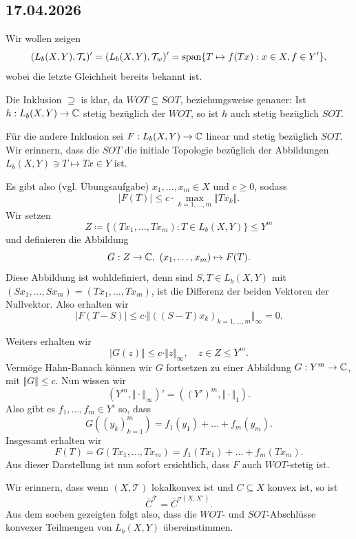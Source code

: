 \subsection*{17.04.2026}

Wir wollen zeigen
$$ (L_b(X, Y), \mathcal{T}_s)' = (L_b(X, Y), \mathcal{T}_w)' = \mathrm{span} \{ T \mapsto f(Tx) : x \in X, f \in Y' \}, $$
wobei die letzte Gleichheit bereits bekannt ist.

Die Inklusion $\supseteq$ is klar, da $WOT \subseteq SOT$, beziehungsweise genauer: Ist $h : L_b(X, Y) \to \mathbb{C}$ stetig bezüglich der $WOT$, so ist $h$ auch stetig bezüglich $SOT$.

Für die andere Inklusion sei $F : L_b(X, Y) \to \mathbb{C}$ linear und stetig bezüglich $SOT$. Wir erinnern, dass die $SOT$ die initiale Topologie bezüglich der Abbildungen $L_b(X, Y) \ni T \mapsto Tx \in Y$ ist.

Es gibt also (vgl. Übungsaufgabe) $x_1, \ldots, x_m \in X$ und $c \geq 0$, sodass
$$ \vert F(T) \vert \leq c \cdot \max_{k=1,\ldots,m} \Vert T x_k \Vert. $$
Wir setzen
$$ Z \coloneqq \{ (T x_1, \ldots, T x_m ) : T \in L_b(X, Y) \} \leq Y^m $$
und definieren die Abbildung
$$ G : Z \to \mathbb{C}, \ (x_1, \ldots, x_m) \mapsto F(T). $$
Diese Abbildung ist wohldefiniert, denn sind $S, T \in L_b(X, Y)$ mit $(S x_1, \ldots, S x_m) = (T x_1, \ldots, T x_m)$, ist die Differenz der beiden Vektoren der Nullvektor. Also erhalten wir
$$ \vert F(T-S) \vert \leq c \cdot \Vert ((S-T)x_k)_{k=1,\ldots,m} \Vert_\infty = 0. $$

Weiters erhalten wir
$$ \vert G(z) \Vert \leq c \cdot \Vert z \Vert_\infty, \quad z \in Z \leq Y^m. $$
Vermöge Hahn-Banach können wir $G$ fortsetzen zu einer Abbildung $G : Y^m \to \mathbb{C}$, mit $\Vert G \Vert \leq c$. Nun wissen wir
$$ (Y^m, \Vert \cdot \Vert_\infty)' = ((Y')^m, \Vert \cdot \Vert_1). $$
Also gibt es $f_1, \ldots, f_m \in Y'$ so, dass
$$ G((y_k)_{k=1}^m) = f_1(y_1) + \ldots + f_m(y_m). $$
Insgesamt erhalten wir
$$ F(T) = G(T x_1, \ldots, T x_m) = f_1(T x_1) + \ldots + f_m(T x_m). $$
Aus dieser Darstellung ist nun sofort ersichtlich, dass $F$ auch $WOT$-stetig ist.

Wir erinnern, dass wenn $(X, \mathcal{T})$ lokalkonvex ist und $C \subseteq X$ konvex ist, so ist
$$ \overline{C}^{\mathcal{T}} = \overline{C}^{\sigma(X, X')}. $$
Aus dem soeben gezeigten folgt also, dass die $WOT$- und $SOT$-Abschlüsse konvexer Teilmengen von $L_b(X, Y)$ übereinstimmen.